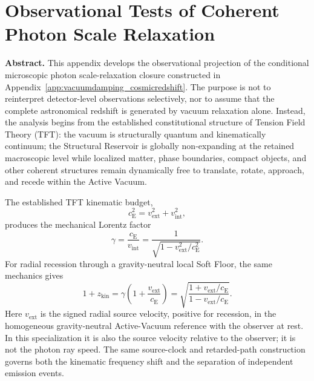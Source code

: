 \chapter{Observational Tests of Coherent Photon Scale Relaxation}
\label{app:time_dilation}

\noindent\textbf{Abstract.}
This appendix develops the observational projection of the conditional
microscopic photon scale-relaxation closure constructed in
Appendix~\ref{app:vacuumdamping_cosmicredshift}. The purpose is not to
reinterpret detector-level observations selectively, nor to assume that the
complete astronomical redshift is generated by vacuum relaxation alone.
Instead, the analysis begins from the established constitutional structure of
Tension Field Theory (TFT): the vacuum is structurally quantum and
kinematically continuum; the Structural Reservoir is globally non-expanding at
the retained macroscopic level while localized matter, phase boundaries,
compact objects, and other coherent structures remain dynamically free to
translate, rotate, approach, and recede within the Active Vacuum.

The established TFT kinematic budget,
\begin{equation}
    c_{\mathrm E}^{2}
    =
    v_{\mathrm{ext}}^{2}
    +
    v_{\mathrm{int}}^{2},
\end{equation}
produces the mechanical Lorentz factor
\begin{equation}
    \gamma
    =
    \frac{c_{\mathrm E}}{v_{\mathrm{int}}}
    =
    \frac{1}{
        \sqrt{
            1-v_{\mathrm{ext}}^{2}/c_{\mathrm E}^{2}
        }
    }.
\end{equation}
For radial recession through a gravity-neutral local Soft Floor, the same
mechanics gives
\begin{equation}
    1+z_{\mathrm{kin}}
    =
    \gamma
    \left(
        1+\frac{v_{\mathrm{ext}}}{c_{\mathrm E}}
    \right)
    =
    \sqrt{
        \frac{
            1+v_{\mathrm{ext}}/c_{\mathrm E}
        }{
            1-v_{\mathrm{ext}}/c_{\mathrm E}
        }
    }.
\end{equation}
Here \(v_{\mathrm{ext}}\) is the signed radial source velocity, positive for
recession, in the homogeneous gravity-neutral Active-Vacuum reference with
the observer at rest. In this specialization it is also the source velocity
relative to the observer; it is not the photon ray speed. The same source-clock
and retarded-path construction governs both the kinematic frequency shift
and the separation of independent emission events.

